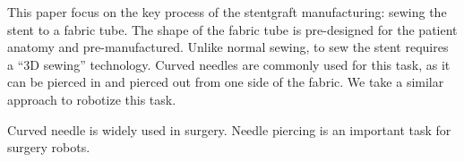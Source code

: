 This paper focus on the key process of the stentgraft manufacturing: sewing the stent to a fabric tube. The shape of the fabric tube is pre-designed for the patient anatomy and pre-manufactured. Unlike normal sewing, to sew the stent requires a ``3D sewing'' technology. Curved needles are commonly used for this task, as it can be pierced in and pierced out from one side of the fabric. We take a similar approach to robotize this task.

Curved needle is widely used in surgery. Needle piercing is an important task for surgery robots.


